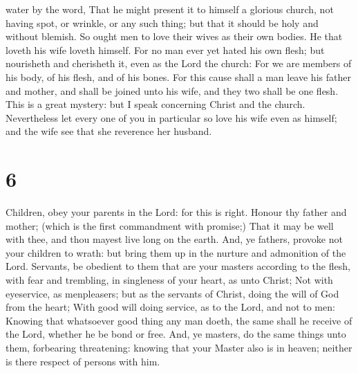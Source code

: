 water by the word,  That he might present it to himself a
glorious church, not having spot, or wrinkle, or any such thing; but
that it should be holy and without blemish.  So ought men
to love their wives as their own bodies. He that loveth his wife loveth
himself.  For no man ever yet hated his own flesh; but
nourisheth and cherisheth it, even as the Lord the church: 
For we are members of his body, of his flesh, and of his bones.
 For this cause shall a man leave his father and mother,
and shall be joined unto his wife, and they two shall be one flesh.
 This is a great mystery: but I speak concerning Christ and
the church.  Nevertheless let every one of you in
particular so love his wife even as himself; and the wife see that she
reverence her husband.

\hypertarget{section-5}{%
\section{6}\label{section-5}}

 Children, obey your parents in the Lord: for this is right.
 Honour thy father and mother; (which is the first
commandment with promise;)  That it may be well with thee,
and thou mayest live long on the earth.  And, ye fathers,
provoke not your children to wrath: but bring them up in the nurture and
admonition of the Lord.  Servants, be obedient to them that
are your masters according to the flesh, with fear and trembling, in
singleness of your heart, as unto Christ;  Not with
eyeservice, as menpleasers; but as the servants of Christ, doing the
will of God from the heart;  With good will doing service,
as to the Lord, and not to men:  Knowing that whatsoever
good thing any man doeth, the same shall he receive of the Lord, whether
he be bond or free.  And, ye masters, do the same things
unto them, forbearing threatening: knowing that your Master also is in
heaven; neither is there respect of persons with him.

